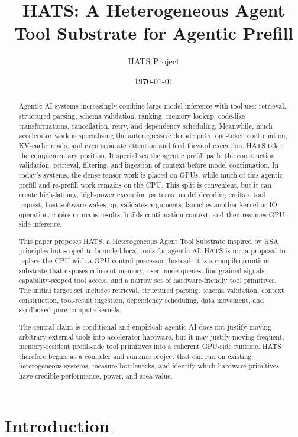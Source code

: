 \documentclass[11pt]{article}
\title{\textbf{HATS: A Heterogeneous Agent Tool Substrate for Agentic Prefill}}
\author{HATS Project}
\date{\today}
\begin{document}
\maketitle

\begin{abstract}
Agentic AI systems increasingly combine large model inference with tool use:
retrieval, structured parsing, schema validation, ranking, memory lookup,
code-like transformations, cancellation, retry, and dependency scheduling.
Meanwhile, much accelerator work is specializing the autoregressive decode path:
one-token continuation, KV-cache reads, and even separate attention and feed
forward execution. HATS takes the complementary position. It specializes the
agentic prefill path: the construction, validation, retrieval, filtering, and
ingestion of context before model continuation. In today's systems, the dense
tensor work is placed on GPUs, while much of this agentic prefill and re-prefill
work remains on the CPU. This split is convenient, but it can create
high-latency, high-power execution patterns: model decoding emits a tool
request, host software wakes up, validates arguments, launches another kernel or
IO operation, copies or maps results, builds continuation context, and then
resumes GPU-side inference.

This paper proposes HATS, a Heterogeneous Agent Tool Substrate inspired by HSA
principles but scoped to bounded local tools for agentic AI. HATS is not a
proposal to replace the CPU with a GPU control processor. Instead, it is a
compiler/runtime substrate that exposes coherent memory, user-mode queues,
fine-grained signals, capability-scoped tool access, and a narrow set of
hardware-friendly tool primitives. The initial target set includes retrieval,
structured parsing, schema validation, context construction, tool-result
ingestion, dependency scheduling, data movement, and sandboxed pure compute
kernels.

The central claim is conditional and empirical: agentic AI does not justify
moving arbitrary external tools into accelerator hardware, but it may justify
moving frequent, memory-resident prefill-side tool primitives into a coherent
GPU-side runtime. HATS therefore begins as a compiler and runtime project that
can run on existing heterogeneous systems, measure bottlenecks, and identify
which hardware primitives have credible performance, power, and area value.
\end{abstract}

\section{Introduction}
\end{document}
